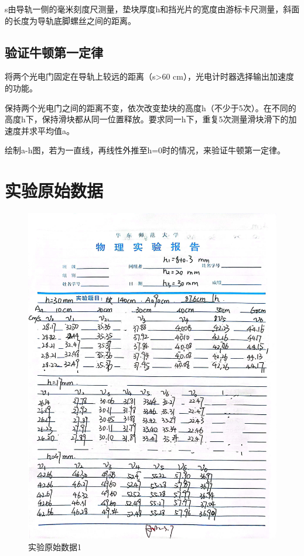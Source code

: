 \documentclass{ctexart}
\begin{document}
  s由导轨一侧的毫米刻度尺测量，垫块厚度h和挡光片的宽度由游标卡尺测量，斜面的长度为导轨底脚螺丝之间的距离。

  \subsection{验证牛顿第一定律}
  将两个光电门固定在导轨上较远的距离（s>60 cm），光电计时器选择输出加速度的功能。

  保持两个光电门之间的距离不变，依次改变垫块的高度h（不少于5次）。在不同的高度h下，保持滑块都从同一位置释放。要求同一h下，重复5次测量滑块滑下的加速度并求平均值a。

  绘制a-h图，若为一直线，再线性外推至h=0时的情况，来验证牛顿第一定律。
\newpage

\section{实验原始数据}
\begin{figure}[H]
  \centering
  \includegraphics[height=0.8\textheight,width=1\textwidth]{yuanshishujv.jpg}
  \caption{实验原始数据1}\label{yuanshishujv}
\end{figure}
\end{document}
